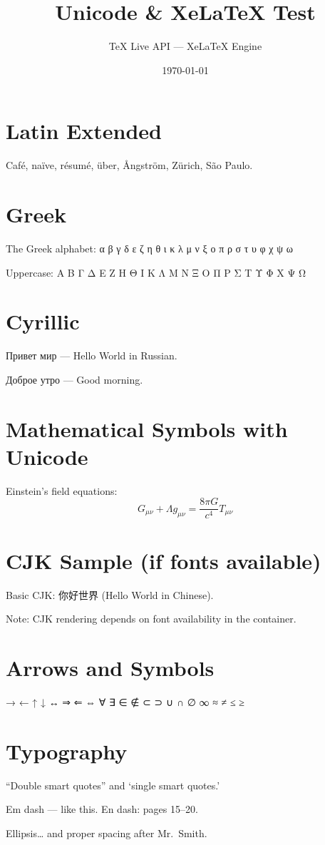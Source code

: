 \documentclass[12pt]{article}
\title{Unicode \& XeLaTeX Test}
\author{TeX Live API — XeLaTeX Engine}
\date{\today}
\begin{document}
\maketitle

\section{Latin Extended}
Café, naïve, résumé, über, Ångström, Zürich, São Paulo.

\section{Greek}
The Greek alphabet: α β γ δ ε ζ η θ ι κ λ μ ν ξ ο π ρ σ τ υ φ χ ψ ω

Uppercase: Α Β Γ Δ Ε Ζ Η Θ Ι Κ Λ Μ Ν Ξ Ο Π Ρ Σ Τ Υ Φ Χ Ψ Ω

\section{Cyrillic}
Привет мир — Hello World in Russian.

Доброе утро — Good morning.

\section{Mathematical Symbols with Unicode}

Einstein's field equations:
\begin{equation}
  G_{\mu\nu} + \Lambda g_{\mu\nu} = \frac{8\pi G}{c^4} T_{\mu\nu}
\end{equation}

\section{CJK Sample (if fonts available)}
Basic CJK: 你好世界 (Hello World in Chinese).

Note: CJK rendering depends on font availability in the container.

\section{Arrows and Symbols}
→ ← ↑ ↓ ↔ ⇒ ⇐ ⇔ ∀ ∃ ∈ ∉ ⊂ ⊃ ∪ ∩ ∅ ∞ ≈ ≠ ≤ ≥

\section{Typography}
``Double smart quotes'' and `single smart quotes.'

Em dash — like this. En dash: pages 15–20.

Ellipsis\ldots{} and proper spacing after Mr.\ Smith.
\end{document}

